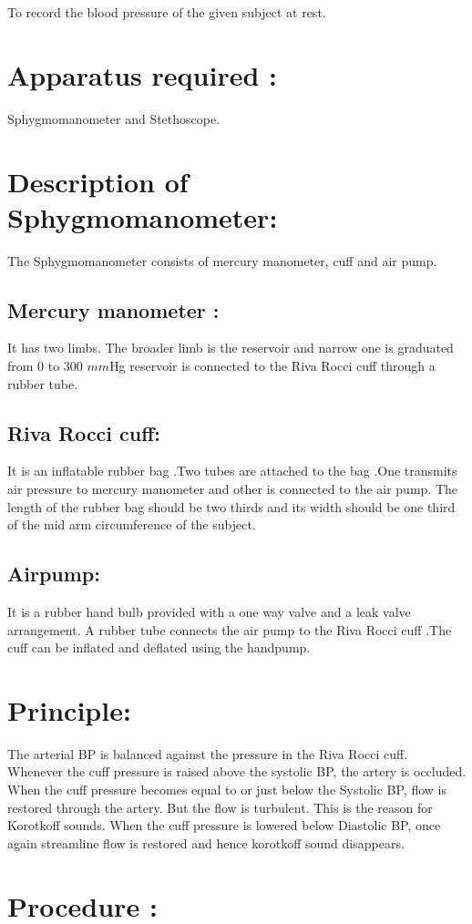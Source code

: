 \documentclass[a4paper,12pt]{book}
\begin{document}
To record the blood pressure of the given subject at rest.
\section*{Apparatus required :}
Sphygmomanometer and Stethoscope.
\section*{Description of Sphygmomanometer:}
The Sphygmomanometer consists of mercury manometer, cuff and air pump.
\subsection*{Mercury manometer :} It has two limbs. The broader limb is the reservoir and narrow one is graduated from 0 to 300 $mm$Hg reservoir is connected to the Riva Rocci cuff through a rubber tube.
\subsection*{Riva Rocci cuff:} It is an inflatable rubber bag .Two tubes are attached to the bag .One transmits air pressure to mercury manometer and other is connected to the air pump. The length of the rubber bag should be two thirds and its width should be one third of the mid arm circumference of the subject.
\subsection*{Airpump:} It is a rubber hand bulb provided with a one way valve and a leak valve arrangement. A rubber tube connects the air pump to the Riva Rocci cuff .The cuff can be inflated and deflated using the handpump.
\section*{Principle:}
The arterial BP is balanced against the pressure in the Riva Rocci cuff. Whenever the cuff pressure is raised above the systolic BP, the artery is occluded. When the cuff pressure becomes equal to or just below the Systolic BP, flow is restored through the artery. But the flow is turbulent. This is the reason for Korotkoff sounds. When the cuff pressure is lowered below Diastolic BP, once again streamline flow is restored and hence korotkoff sound disappears.
\section*{Procedure :}
\end{document}
